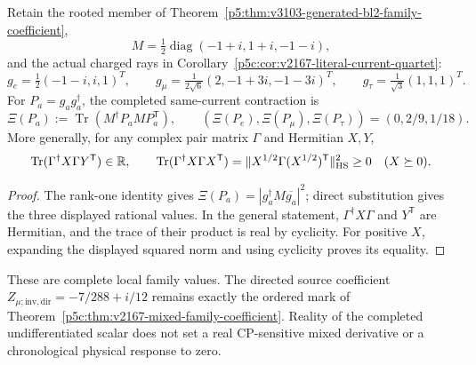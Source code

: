 \documentclass[12pt,a4paper]{article}
\begin{document}
\begin{theorem}
\label{p5c:thm:next187-completed-local-pair-current}
Retain the rooted member of
Theorem~\ref{p5:thm:v3103-generated-bl2-family-coefficient},
\[
 M=\tfrac12\operatorname{diag}(-1+i,1+i,-1-i),
\]
and the actual charged rays in
Corollary~\ref{p5c:cor:v2167-literal-current-quartet}:
\[
 g_e=\tfrac12(-1-i,i,1)^T,\qquad
 g_\mu=\tfrac1{2\sqrt6}(2,-1+3i,-1-3i)^T,\qquad
 g_\tau=\tfrac1{\sqrt3}(1,1,1)^T.
\]
For $P_a=g_ag_a^\dagger$, the completed same-current contraction is
\begin{equation}
 \boxed{\Xi(P_a):=\operatorname{Tr}(M^\dagger P_aMP_a^{\mathsf T}),
 \qquad (\Xi(P_e),\Xi(P_\mu),\Xi(P_\tau))=(0,2/9,1/18).}
 \label{p5c:eq:next187-completed-local-values}
\end{equation}
More generally, for any complex pair matrix $\Gamma$ and Hermitian $X,Y$,
\begin{equation}
 \operatorname{Tr}(\Gamma^\dagger X\Gamma Y^{\mathsf T})\in\mathbb R,
 \qquad
 \operatorname{Tr}(\Gamma^\dagger X\Gamma X^{\mathsf T})
 =\|X^{1/2}\Gamma(X^{1/2})^{\mathsf T}\|_{\rm HS}^2\ge0
 \quad(X\succeq0).
 \label{p5c:eq:next187-hermitian-pair-return}
\end{equation}
\end{theorem}
\begin{proof}
The rank-one identity gives
$\Xi(P_a)=|g_a^\dagger M\overline{g_a}|^2$; direct substitution gives
the three displayed rational values. In the general statement,
$\Gamma^\dagger X\Gamma$ and $Y^{\mathsf T}$ are Hermitian, and the
trace of their product is real by cyclicity. For positive $X$, expanding
the displayed squared norm and using cyclicity proves its equality.
\end{proof}
These are complete local family values. The directed source coefficient
$Z_{\mu;\mathrm{inv,dir}}=-7/288+i/12$ remains exactly the ordered mark
of Theorem~\ref{p5c:thm:v2167-mixed-family-coefficient}. Reality of the
completed undifferentiated scalar does not set a real CP-sensitive mixed
derivative or a chronological physical response to zero.
\end{document}
